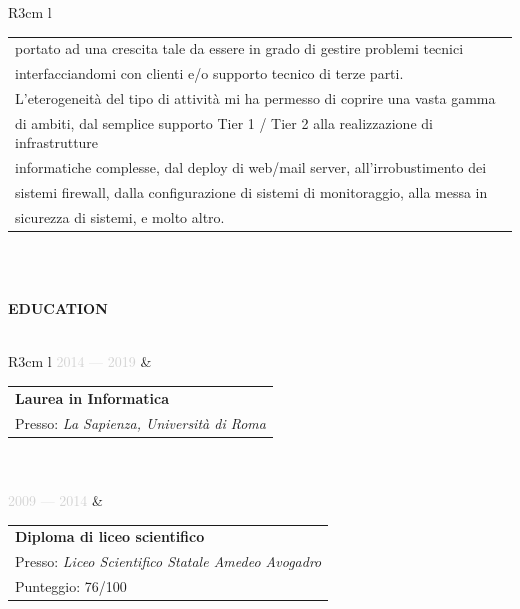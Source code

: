 \documentclass{article}
\begin{document}
\begin{tabular}{ R{3cm} l }
\begin{tabular}[l]{@{}l@{}}
		portato ad una crescita tale da essere in grado di gestire problemi tecnici \\
		interfacciandomi con clienti e/o supporto tecnico di terze parti. \\
		L'eterogeneità del tipo di attivit\`a mi ha permesso di coprire una vasta gamma \\
		di ambiti, dal semplice supporto Tier 1 / Tier 2 alla realizzazione di infrastrutture \\
		informatiche complesse, dal deploy di web/mail server, all'irrobustimento dei \\
		sistemi firewall, dalla configurazione di sistemi di monitoraggio, alla messa in \\
		sicurezza di sistemi, e molto altro.
		\end{tabular} \\\\ \hfill
\end{tabular}

\textbf{\textcolor{deepblue}{\uppercase{{{education}}}}} \\\\ \hfill
\begin{tabular}{ R{3cm} l }
	\textcolor{lightgray}{2014 — 2019} & \begin{tabular}[l]{@{}l@{}}
	\textbf{Laurea in Informatica} \\
	Presso: \textit{La Sapienza, Universit\`a di Roma} \\
\end{tabular} \\\\ \hfill
\textcolor{lightgray}{2009 — 2014}  & \begin{tabular}[l]{@{}l@{}}
\textbf{Diploma di liceo scientifico} \\
Presso: \textit{Liceo Scientifico Statale Amedeo Avogadro} \\
Punteggio: 76/100
\end{tabular} \\\\ \hfill
\end{tabular}

\newpage
\end{document}
